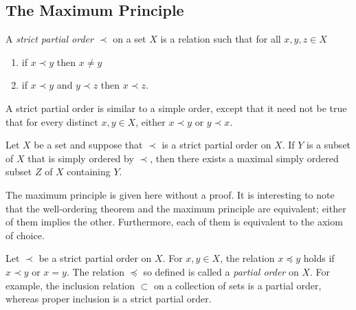 \subsection{The Maximum Principle}

A \emph{strict partial order $\prec$} on a set $X$ is a relation such that for all $x, y, z \in X$
\begin{enumerate}
\item if $x \prec y$ then $x \neq y$
\item if $x \prec y$ and $y \prec z$ then $x \prec z$.
\end{enumerate}

A strict partial order is similar to a simple order, except that it need not be true that for every distinct $x, y \in X$, either $x \prec y$ or $y \prec x$.

\begin{fact}
Let $X$ be a set and suppose that $\prec$ is a strict partial order on $X$.
If $Y$ is a subset of $X$ that is simply ordered by $\prec$, then there exists a maximal simply ordered subset $Z$ of $X$ containing $Y$.
\end{fact}

The maximum principle is given here without a proof.
It is interesting to note that the well-ordering theorem and the maximum principle are equivalent; either of them implies the other.
Furthermore, each of them is equivalent to the axiom of choice.

Let $\prec$ be a strict partial order on $X$.
For $x, y \in X$, the relation $x \preceq y$ holds if $x \prec y$ or $x = y$.
The relation $\preceq$ so defined is called a \emph{partial order} on $X$.
For example, the inclusion relation $\subset$ on a collection of sets is a partial order, whereas proper inclusion is a strict partial order.

